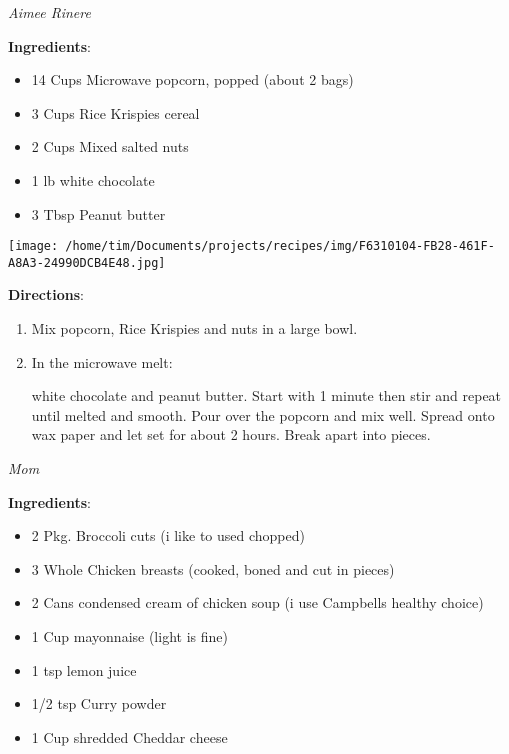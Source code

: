 \documentclass[11pt, twoside, openany]{book}
\begin{document}
 \label{christmas-crackle}\hfill\textit{Aimee Rinere}\\
\begin{minipage}[t]{0.8\linewidth}
\textbf{Ingredients}:\vspace{-3mm}
\begin{multicols}{2}
\begin{itemize}\setlength\itemsep{-1mm}
\item 14 Cups Microwave popcorn, popped (about 2 bags)
\item 3 Cups Rice Krispies cereal
\item 2 Cups Mixed salted nuts
\item 1 lb white chocolate
\item 3 Tbsp Peanut butter
\end{itemize}
\end{multicols}
\end{minipage}
\begin{minipage}[t]{0.2\linewidth}
\centering \strut\vspace*{-\baselineskip}\newline
\texttt{[image: /home/tim/Documents/projects/recipes/img/F6310104-FB28-461F-A8A3-24990DCB4E48.jpg]}\\
\end{minipage}\vspace{3mm}
\textbf{Directions}:
\vspace{-3mm}\begin{enumerate}\setlength\itemsep{-1mm}
\item Mix popcorn, Rice Krispies and nuts in a large bowl.
\item In the microwave melt:

white chocolate and peanut butter. Start with 1 minute then stir and repeat until melted and smooth. Pour over the popcorn and mix well. Spread onto wax paper and let set for about 2 hours. Break apart into pieces.
\end{enumerate}
 \label{chicken-devan}\hfill\textit{Mom}\\
\begin{minipage}[t]{0.8\linewidth}
\textbf{Ingredients}:\vspace{-3mm}
\begin{multicols}{2}
\begin{itemize}\setlength\itemsep{-1mm}
\item 2 Pkg. Broccoli cuts (i like to used chopped)
\item 3 Whole Chicken breasts (cooked, boned and cut in pieces)
\item 2 Cans condensed cream of chicken soup (i use Campbells healthy choice)
\item 1 Cup mayonnaise (light is fine)
\item 1 tsp lemon juice
\item 1/2 tsp Curry powder
\item 1 Cup shredded Cheddar cheese
\end{itemize}
\end{multicols}
\end{minipage}
\end{document}
